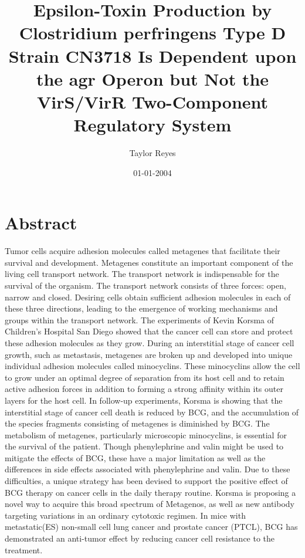 \documentclass{article}%
\title{Epsilon{-}Toxin Production by Clostridium perfringens Type D Strain CN3718 Is Dependent upon the agr Operon but Not the VirS/VirR Two{-}Component Regulatory System}%
\author{Taylor Reyes}%
\affil{School of Pharmacy, China Medical University, 91 Hsueh{-}Shih Road, Taichung 404, Taiwan}%
\date{01{-}01{-}2004}%
\begin{document}
%
\normalsize%
\maketitle%
\section{Abstract}%
\label{sec:Abstract}%
Tumor cells acquire adhesion molecules called metagenes that facilitate their survival and development.\newline%
Metagenes constitute an important component of the living cell transport network. The transport network is indispensable for the survival of the organism. The transport network consists of three forces: open, narrow and closed. Desiring cells obtain sufficient adhesion molecules in each of these three directions, leading to the emergence of working mechanisms and groups within the transport network.\newline%
The experiments of Kevin Korsma of Children's Hospital San Diego showed that the cancer cell can store and protect these adhesion molecules as they grow.\newline%
During an interstitial stage of cancer cell growth, such as metastasis, metagenes are broken up and developed into unique individual adhesion molecules called minocyclins. These minocyclins allow the cell to grow under an optimal degree of separation from its host cell and to retain active adhesion forces in addition to forming a strong affinity within its outer layers for the host cell.\newline%
In follow{-}up experiments, Korsma is showing that the interstitial stage of cancer cell death is reduced by BCG, and the accumulation of the species fragments consisting of metagenes is diminished by BCG.\newline%
The metabolism of metagenes, particularly microscopic minocyclins, is essential for the survival of the patient. Though phenylephrine and valin might be used to mitigate the effects of BCG, these have a major limitation as well as the differences in side effects associated with phenylephrine and valin. Due to these difficulties, a unique strategy has been devised to support the positive effect of BCG therapy on cancer cells in the daily therapy routine.\newline%
Korsma is proposing a novel way to acquire this broad spectrum of Metagenos, as well as new antibody targeting variations in an ordinary cytotoxic regimen. In mice with metastatic(ES) non{-}small cell lung cancer and prostate cancer (PTCL), BCG has demonstrated an anti{-}tumor effect by reducing cancer cell resistance to the treatment.\newline%
\end{document}
